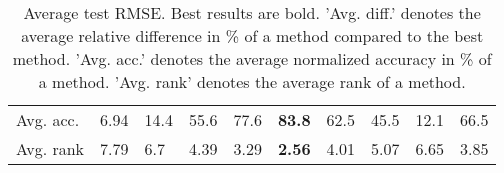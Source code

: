 \begin{table}[ht!]
\begin{tabular}{llllllllll}
  Avg. acc. & 6.94 & 14.4 & 55.6 & 77.6 & \textbf{83.8} & 62.5 & 45.5 & 12.1 & 66.5 \\ 
  Avg. rank & 7.79 & 6.7 & 4.39 & 3.29 & \textbf{2.56} & 4.01 & 5.07 & 6.65 & 3.85 \\ 
   \hline
\hline
\end{tabular}
\endgroup
\caption{Average test RMSE. 
                  Best results are bold. 
                  'Avg. diff.' denotes the average relative difference in \% of a method compared to the best method.
                  'Avg. acc.' denotes the average normalized accuracy in \% of a method.
                  'Avg. rank' denotes the average rank of a method.} 
\label{TABLES/table_results_RMSE}
\end{table}
